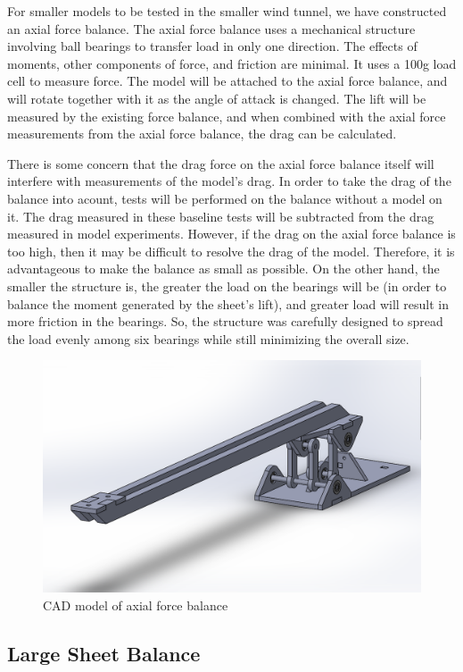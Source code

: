 \documentclass[12pt]{report} %
\begin{document}
For smaller models to be tested in the smaller wind tunnel, we have constructed an axial force balance.
The axial force balance uses a mechanical structure involving ball bearings
to transfer load in only one direction. The effects of moments, other components of force, and friction are minimal. It uses a 100g load cell
to measure force. The model will be attached to the axial force balance, and will rotate together with it as the angle of attack is changed.
The lift will be measured by the existing force balance, and when combined with the axial force measurements from the axial force balance,
the drag can be calculated.

There is some concern that the drag force on the axial force balance itself will interfere with measurements of the model's drag. In order to
take the drag of the balance into acount, tests will be performed on the balance without a model on it. The drag measured in these baseline tests
will be subtracted from the drag measured in model experiments. However, if the drag on the axial force balance is too high, then it may be difficult
to resolve the drag of the model. Therefore, it is advantageous to make the balance as small as possible. On the other hand, the smaller
the structure is,
the greater the load on the bearings will be (in order to balance the moment generated by the sheet's lift), and greater load will result in more
friction in the bearings. So, the structure was carefully designed to spread the load evenly among six bearings while still minimizing
the overall size.

\begin{figure}
\includegraphics[width = 0.7\linewidth]{mount.png}
\centering
\caption{CAD model of axial force balance}
\label{mount}
\end{figure}


\subsection{Large Sheet Balance}
\end{document}
